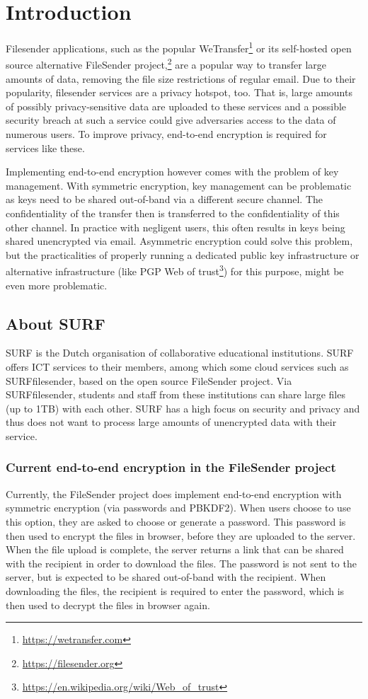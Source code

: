 \chapter{Introduction}\label{ch:introduction}
Filesender applications, such as the popular WeTransfer\footnote{\url{https://wetransfer.com}} or its self-hosted open source alternative FileSender project,\footnote{\url{https://filesender.org}} are a popular way to transfer large amounts of data, removing the file size restrictions of regular email.
Due to their popularity, filesender services are a privacy hotspot, too.
That is, large amounts of possibly privacy-sensitive data are uploaded to these services and a possible security breach at such a service could give adversaries access to the data of numerous users.
To improve privacy, end-to-end encryption is required for services like these.

Implementing end-to-end encryption however comes with the problem of key management.
With symmetric encryption, key management can be problematic as keys need to be shared out-of-band via a different secure channel.
The confidentiality of the transfer then is transferred to the confidentiality of this other channel.
In practice with negligent users, this often results in keys being shared unencrypted via email.
Asymmetric encryption could solve this problem, but the practicalities of properly running a dedicated public key infrastructure or alternative infrastructure (like PGP Web of trust\footnote{\url{https://en.wikipedia.org/wiki/Web_of_trust}}) for this purpose, might be even more problematic.

\section{About SURF}\label{sec:about-surf}
SURF is the Dutch organisation of collaborative educational institutions.
SURF offers ICT services to their members, among which some cloud services such as SURFfilesender, based on the open source FileSender project.
Via SURFfilesender, students and staff from these institutions can share large files (up to 1TB) with each other.
SURF has a high focus on security and privacy and thus does not want to process large amounts of unencrypted data with their service.

\subsection{Current end-to-end encryption in the FileSender project}\label{subsec:current-end-to-end-encryption-in-the-filesender-project}
Currently, the FileSender project does implement end-to-end encryption with symmetric encryption (via passwords and PBKDF2).
When users choose to use this option, they are asked to choose or generate a password.
This password is then used to encrypt the files in browser, before they are uploaded to the server.
When the file upload is complete, the server returns a link that can be shared with the recipient in order to download the files.
The password is not sent to the server, but is expected to be shared out-of-band with the recipient.
When downloading the files, the recipient is required to enter the password, which is then used to decrypt the files in browser again.

